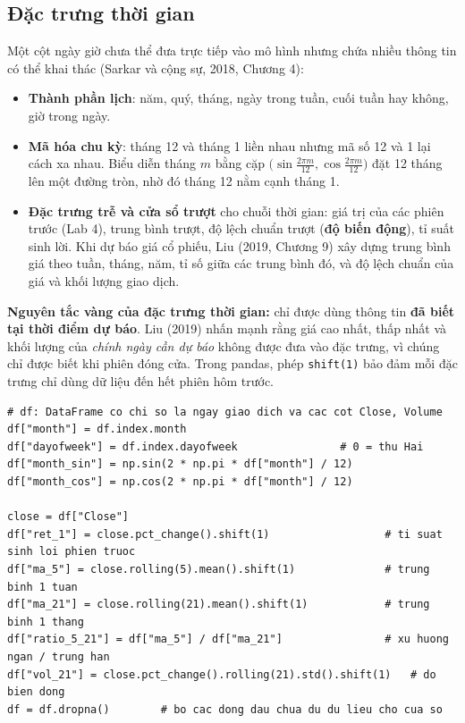 \subsection{Đặc trưng thời gian}

Một cột ngày giờ chưa thể đưa trực tiếp vào mô hình nhưng chứa nhiều thông tin có thể khai thác (Sarkar và cộng sự, 2018, Chương 4):
\begin{itemize}
    \item \textbf{Thành phần lịch}: năm, quý, tháng, ngày trong tuần, cuối tuần hay không, giờ trong ngày.
    \item \textbf{Mã hóa chu kỳ}: tháng 12 và tháng 1 liền nhau nhưng mã số 12 và 1 lại cách xa nhau. Biểu diễn tháng $m$ bằng cặp $\big(\sin\frac{2\pi m}{12}, \cos\frac{2\pi m}{12}\big)$ đặt 12 tháng lên một đường tròn, nhờ đó tháng 12 nằm cạnh tháng 1.
    \item \textbf{Đặc trưng trễ và cửa sổ trượt} cho chuỗi thời gian: giá trị của các phiên trước (Lab 4), trung bình trượt, độ lệch chuẩn trượt (\textbf{độ biến động}), tỉ suất sinh lời. Khi dự báo giá cổ phiếu, Liu (2019, Chương 9) xây dựng trung bình giá theo tuần, tháng, năm, tỉ số giữa các trung bình đó, và độ lệch chuẩn của giá và khối lượng giao dịch.
\end{itemize}

\noindent\textbf{Nguyên tắc vàng của đặc trưng thời gian:} chỉ được dùng thông tin \textbf{đã biết tại thời điểm dự báo}. Liu (2019) nhấn mạnh rằng giá cao nhất, thấp nhất và khối lượng của \textit{chính ngày cần dự báo} không được đưa vào đặc trưng, vì chúng chỉ được biết khi phiên đóng cửa. Trong pandas, phép \texttt{shift(1)} bảo đảm mỗi đặc trưng chỉ dùng dữ liệu đến hết phiên hôm trước.

\begin{lstlisting}[caption={Tạo đặc trưng thời gian và đặc trưng cửa sổ trượt}]
# df: DataFrame co chi so la ngay giao dich va cac cot Close, Volume
df["month"] = df.index.month
df["dayofweek"] = df.index.dayofweek                # 0 = thu Hai
df["month_sin"] = np.sin(2 * np.pi * df["month"] / 12)
df["month_cos"] = np.cos(2 * np.pi * df["month"] / 12)

close = df["Close"]
df["ret_1"] = close.pct_change().shift(1)                  # ti suat sinh loi phien truoc
df["ma_5"] = close.rolling(5).mean().shift(1)              # trung binh 1 tuan
df["ma_21"] = close.rolling(21).mean().shift(1)            # trung binh 1 thang
df["ratio_5_21"] = df["ma_5"] / df["ma_21"]                # xu huong ngan / trung han
df["vol_21"] = close.pct_change().rolling(21).std().shift(1)   # do bien dong
df = df.dropna()        # bo cac dong dau chua du du lieu cho cua so
\end{lstlisting}

